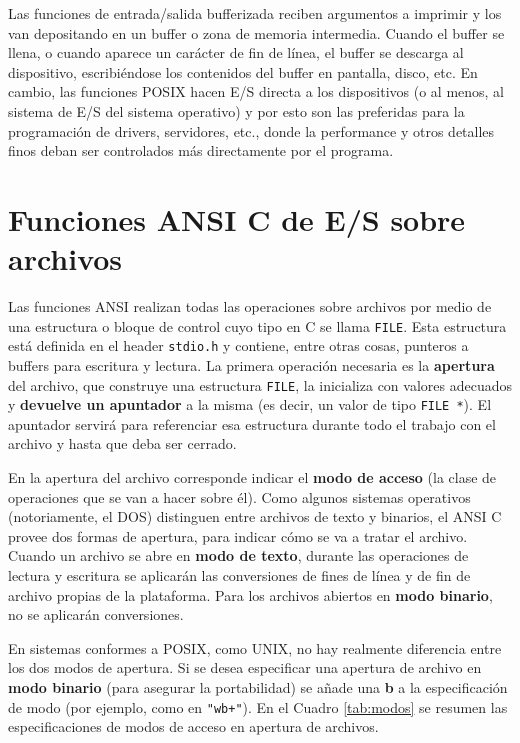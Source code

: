 Las funciones de entrada/salida bufferizada reciben argumentos a imprimir y
los van depositando en un buffer o zona de memoria intermedia.
Cuando el buffer se llena, o cuando aparece un carácter de fin de línea, el
buffer se descarga al dispositivo, escribiéndose los contenidos del buffer en
pantalla, disco, etc. En cambio, las funciones POSIX hacen E/S 
directa a los dispositivos (o al menos, al sistema de E/S del sistema
operativo) y por esto son las preferidas para la programación de drivers,
servidores, etc., donde la performance y otros detalles finos deban ser
controlados más directamente por el programa.

\section{Funciones ANSI C de E/S sobre archivos}
\label{subsec:esarchivosansic}
Las funciones ANSI realizan todas las operaciones sobre archivos por medio de
una estructura o bloque de control cuyo tipo en C se llama \lstinline{FILE}. Esta
estructura está definida en el header \lstinline{stdio.h} y contiene, entre otras cosas,
punteros a buffers para escritura y lectura. La primera operación necesaria es
la \textbf{apertura} del archivo, que construye una estructura \lstinline{FILE}, la inicializa con
valores adecuados y \textbf{devuelve un apuntador} a la misma (es decir, un valor de tipo \lstinline{FILE *}). El apuntador servirá para
referenciar esa estructura durante todo el trabajo con el archivo y hasta que deba ser
cerrado.

En la apertura del archivo corresponde indicar el \textbf{modo de acceso} (la clase de
operaciones que se van a hacer sobre él). Como algunos sistemas operativos
(notoriamente, el DOS) distinguen entre archivos de texto y binarios, el ANSI C
provee dos formas de apertura, para indicar cómo se va a tratar el archivo.
Cuando un archivo se abre en \textbf{modo de texto}, durante las operaciones de lectura
y escritura se aplicarán las conversiones de fines de línea y de fin de archivo
propias de la plataforma. Para los archivos abiertos en \textbf{modo binario}, no se
aplicarán conversiones.

En sistemas conformes a POSIX, como UNIX, no hay realmente diferencia entre los
dos modos de apertura. Si se desea especificar una apertura de archivo en \textbf{modo
binario} (para asegurar la portabilidad) se añade una \textbf{b} a la especificación de
modo (por ejemplo, como en \lstinline{"wb+"}). En el Cuadro \ref{tab:modos} se resumen las especificaciones de modos de acceso en apertura de archivos. 

